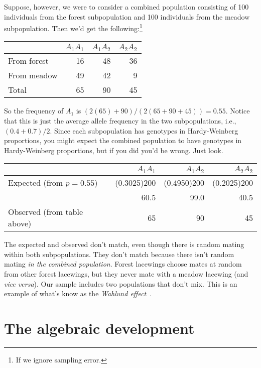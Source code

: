 \documentclass[12pt]{article}
\begin{document}
Suppose, however, we were to consider a combined population consisting
of 100 individuals from the forest subpopulation and 100 individuals
from the meadow subpopulation. Then we'd get the
following:\footnote{If we ignore sampling error.}

\begin{center}
\begin{tabular}{l|rrr}
\hline\hline
       & $A_1A_1$ & $A_1A_2$ & $A_2A_2$ \\
\hline
From forest & 16  & 48       & 36 \\
From meadow & 49  & 42       & 9 \\
\hline
Total       & 65  & 90       & 45 \\
\hline
\end{tabular}
\end{center}
So the frequency of $A_1$ is $(2(65) + 90)/(2(65 + 90 + 45)) =
0.55$. Notice that this is just the average allele frequency in the
two subpopulations, i.e., $(0.4 + 0.7)/2$. Since each subpopulation has
genotypes in Hardy-Weinberg proportions, you might expect the combined
population to have genotypes in Hardy-Weinberg proportions, but if you did
you'd be wrong. Just look.

\begin{center}
\begin{tabular}{l|rrr}
\hline\hline
                            & $A_1A_1$ & $A_1A_2$ & $A_2A_2$ \\
\hline
Expected (from $p=0.55$)    & (0.3025)200 & (0.4950)200 & (0.2025)200 \\
                            & 60.5     & 99.0     & 40.5 \\
Observed (from table above) & 65       & 90       & 45 \\
\hline
\end{tabular}
\end{center}
The expected and observed don't match, even though there is random
mating within both subpopulations. They don't match because there
isn't random mating {\it in the combined population}. Forest lacewings
choose mates at random from other forest lacewings, but they never
mate with a meadow lacewing (and {\it vice versa\/}). Our sample
includes two populations that don't mix. This is an example of what's
know as the {\it Wahlund effect}~\cite{Wahlund-1928}.

\section*{The algebraic development}
\end{document}
